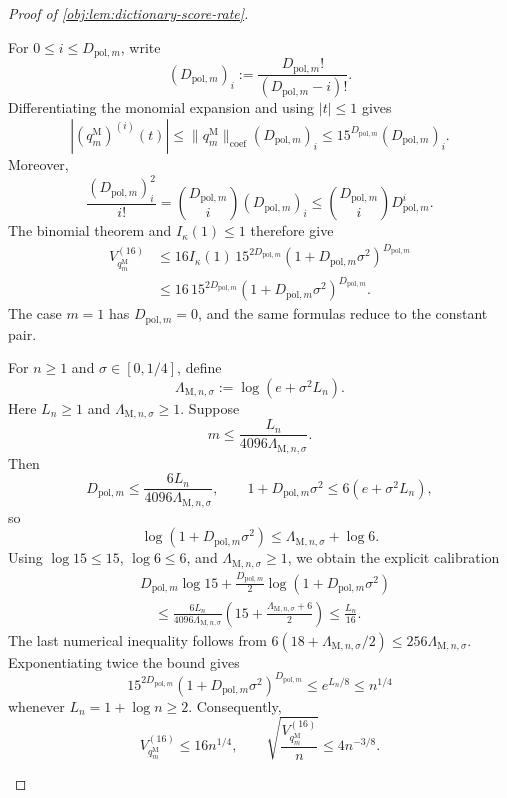 \begin{proof}[Proof of \cref{obj:lem:dictionary-score-rate}]
\begin{enumerate}
For \(0\le i\le D_{\mathrm{pol},m}\), write
\[
(D_{\mathrm{pol},m})_i
:=\frac{D_{\mathrm{pol},m}!}{(D_{\mathrm{pol},m}-i)!}.
\]
Differentiating the monomial expansion and using \(|t|\le1\) gives
\[
|(q_m^{\mathrm M})^{(i)}(t)|
\le\|q_m^{\mathrm M}\|_{\mathrm{coef}}(D_{\mathrm{pol},m})_i
\le15^{D_{\mathrm{pol},m}}(D_{\mathrm{pol},m})_i.
\]
Moreover,
\[
\frac{(D_{\mathrm{pol},m})_i^2}{i!}
=\binom{D_{\mathrm{pol},m}}i(D_{\mathrm{pol},m})_i
\le\binom{D_{\mathrm{pol},m}}iD_{\mathrm{pol},m}^i.
\]
The binomial theorem and \(I_\kappa(1)\le1\) therefore give
\[
\begin{aligned}
V_{q_m^{\mathrm M}}^{(16)}
&\le16I_\kappa(1)\,15^{2D_{\mathrm{pol},m}}
       (1+D_{\mathrm{pol},m}\sigma^2)^{D_{\mathrm{pol},m}}\\
&\le16\,15^{2D_{\mathrm{pol},m}}
       (1+D_{\mathrm{pol},m}\sigma^2)^{D_{\mathrm{pol},m}}.
\end{aligned}
\]
The case \(m=1\) has \(D_{\mathrm{pol},m}=0\), and the same formulas reduce to the constant pair.

For \(n\ge1\) and \(\sigma\in[0,1/4]\), define
\[
\Lambda_{\mathrm M,n,\sigma}:=\log(e+\sigma^2L_n).
\]
Here \(L_n\ge1\) and \(\Lambda_{\mathrm M,n,\sigma}\ge1\). Suppose
\[
m\le\frac{L_n}{4096\Lambda_{\mathrm M,n,\sigma}}.
\]
Then
\[
D_{\mathrm{pol},m}
\le\frac{6L_n}{4096\Lambda_{\mathrm M,n,\sigma}},
\qquad
1+D_{\mathrm{pol},m}\sigma^2
\le6(e+\sigma^2L_n),
\]
so
\[
\log(1+D_{\mathrm{pol},m}\sigma^2)
\le\Lambda_{\mathrm M,n,\sigma}+\log6.
\]
Using \(\log15\le15\), \(\log6\le6\), and
\(\Lambda_{\mathrm M,n,\sigma}\ge1\), we obtain the explicit calibration
\[
\begin{aligned}
&D_{\mathrm{pol},m}\log15
+\frac{D_{\mathrm{pol},m}}2
 \log(1+D_{\mathrm{pol},m}\sigma^2)\\
&\quad\le
\frac{6L_n}{4096\Lambda_{\mathrm M,n,\sigma}}
\left(15+\frac{\Lambda_{\mathrm M,n,\sigma}+6}{2}\right)
\le\frac{L_n}{16}.
\end{aligned}
\]
The last numerical inequality follows from
\(6(18+\Lambda_{\mathrm M,n,\sigma}/2)
\le256\Lambda_{\mathrm M,n,\sigma}\).
Exponentiating twice the bound gives
\[
15^{2D_{\mathrm{pol},m}}
(1+D_{\mathrm{pol},m}\sigma^2)^{D_{\mathrm{pol},m}}
\le e^{L_n/8}\le n^{1/4}
\]
whenever \(L_n=1+\log n\ge2\). Consequently,
\[
V_{q_m^{\mathrm M}}^{(16)}\le16n^{1/4},
\qquad
\sqrt{\frac{V_{q_m^{\mathrm M}}^{(16)}}{n}}\le4n^{-3/8}.
\]


\end{enumerate}
\end{proof}
